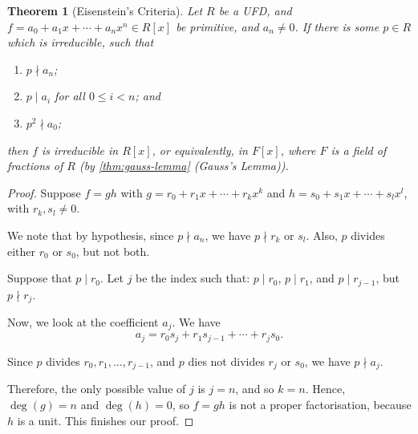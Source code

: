 \documentclass{article}
\newtheorem{theorem}{Theorem}[section]
\theoremstyle{definition}
\theoremstyle{remark}
\newcommand{\pqty}[1]{\left(#1\right)}
\newcommand{\bqty}[1]{\left[#1\right]}
\newcommand{\divides}{\mid}
\newcommand{\notdivides}{\nmid}
\begin{document}
\begin{theorem}[Eisenstein's Criteria]
    \label{thm:eisenstein}%
    Let \(R\) be a UFD, and \(f = a_0 + a_1 x + \cdots + a_n x^n \in R \bqty{x}\) be primitive, and \(a_n \neq 0\). If there is some \(p \in R\) which is irreducible, such that
    \begin{enumerate}
        \item \(p \notdivides a_n\);
        \item \(p \divides a_i\) for all \(0 \leq i < n\); and
        \item \(p^2 \notdivides a_0\);
   \end{enumerate}
   then \(f\) is irreducible in \(R\bqty{x}\), or equivalently, in \(F\bqty{x}\), where \(F\) is a field of fractions of \(R\) (by \autoref{thm:gauss-lemma} (Gauss's Lemma)).
\end{theorem}

\begin{proof}
    Suppose \(f = gh\) with \(g = r_0 + r_1 x + \cdots + r_k x^k\) and \(h = s_0 + s_1 x + \cdots + s_l x^l\), with \(r_k, s_l \neq 0\).

    We note that by hypothesis, since \(p \notdivides a_n\), we have \(p \notdivides r_k\) or \(s_l\). Also, \(p\) divides either \(r_0\) or \(s_0\), but not both.

    Suppose that \(p \divides r_0\). Let \(j\) be the index such that: \(p \divides r_0\), \(p \divides r_1\), and \(p \divides r_{j - 1}\), but \(p \notdivides r_j\).

    Now, we look at the coefficient \(a_j\). We have
    \[
        a_j = r_0 s_j + r_1 s_{j - 1} + \cdots + r_j s_0.
    \]

    Since \(p\) divides \(r_0, r_1, \ldots, r_{j - 1}\), and \(p\) dies not divides \(r_j\) or \(s_0\), we have \(p \notdivides a_j\).

    Therefore, the only possible value of \(j\) is \(j = n\), and so \(k = n\). Hence, \(\deg\pqty{g} = n\) and \(\deg\pqty{h} = 0\), so \(f = gh\) is not a proper factorisation, because \(h\) is a unit. This finishes our proof.
\end{proof}
\end{document}
